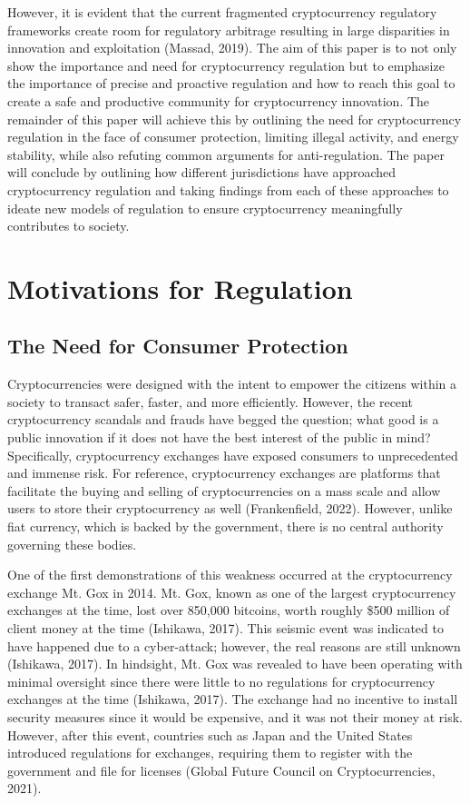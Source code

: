 \documentclass{article}
\begin{document}
\noindent \newline However, it is evident that the current fragmented cryptocurrency regulatory frameworks create room for regulatory arbitrage resulting in large disparities in innovation and exploitation (Massad, 2019). The aim of this paper is to not only show the importance and need for cryptocurrency regulation but to emphasize the importance of precise and proactive regulation and how to reach this goal to create a safe and productive community for cryptocurrency innovation. The remainder of this paper will achieve this by outlining the need for cryptocurrency regulation in the face of consumer protection, limiting illegal activity, and energy stability, while also refuting common arguments for anti-regulation. The paper will conclude by outlining how different jurisdictions have approached cryptocurrency regulation and taking findings from each of these approaches to ideate new models of regulation to ensure cryptocurrency meaningfully contributes to society.



\section{Motivations for Regulation}
\subsection {The Need for Consumer Protection}

\noindent Cryptocurrencies were designed with the intent to empower the citizens within a society to transact safer, faster, and more efficiently. However, the recent cryptocurrency scandals and frauds have begged the question; what good is a public innovation if it does not have the best interest of the public in mind? Specifically, cryptocurrency exchanges have exposed consumers to unprecedented and immense risk. For reference, cryptocurrency exchanges are platforms that facilitate the buying and selling of cryptocurrencies on a mass scale and allow users to store their cryptocurrency as well (Frankenfield, 2022). However, unlike fiat currency, which is backed by the government, there is no central authority governing these bodies. 

\noindent \newline One of the first demonstrations of this weakness occurred at the cryptocurrency exchange Mt. Gox in 2014. Mt. Gox, known as one of the largest cryptocurrency exchanges at the time, lost over 850,000 bitcoins, worth roughly \$500 million of client money at the time (Ishikawa, 2017). This seismic event was indicated to have happened due to a cyber-attack; however, the real reasons are still unknown (Ishikawa, 2017). In hindsight, Mt. Gox was revealed to have been operating with minimal oversight since there were little to no regulations for cryptocurrency exchanges at the time (Ishikawa, 2017). The exchange had no incentive to install security measures since it would be expensive, and it was not their money at risk. However, after this event, countries such as Japan and the United States introduced regulations for exchanges, requiring them to register with the government and file for licenses (Global Future Council on Cryptocurrencies, 2021).
\end{document}
